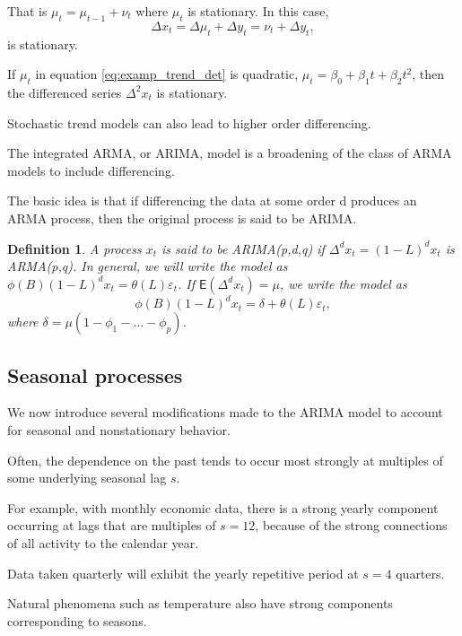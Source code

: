 \documentclass[
paper=128mm:96mm, %
fontsize=9.5pt, %
pagesize, %
parskip=half-, %
]{scrartcl} %
\theoremstyle{mythmstyle} %
\newtheorem{definition}[theorem]{Definition} %
\begin{document}
That is $\mu_t=\mu_{t-1}+\nu_t$ where $\mu_t$ is stationary. In this case,
%
\begin{equation}
\Delta x_t=\Delta \mu_t+\Delta y_t=\nu_t+\Delta y_t,
\end{equation}
%
is stationary. 

If $\mu_t$ in equation \eqref{eq:examp_trend_det} is quadratic, $\mu_t=\beta_0+\beta_1t+\beta_2t^2$, then the differenced series $\Delta^2x_t$  is stationary. 

Stochastic trend models can also lead to higher order differencing. 

The integrated ARMA, or ARIMA, model is a broadening of the class of ARMA models to include differencing. 

The basic idea is that if differencing the data at some order d produces an ARMA process, then the original process is said to be ARIMA.
\clearpage

\begin{definition}

A process $x_t$ is said to be ARIMA(p,d,q) if $\Delta^d x_t =(1-L)^dx_t$
is ARMA(p,q). In general, we will write the model as $\phi(B)(1-L)^dx_t=\theta(L)\varepsilon_t$.
If $\mathsf{E}(\Delta^dx_t)=\mu$, we write the model as
%
\begin{equation}
\phi(B)(1-L)^dx_t =\delta+\theta(L)\varepsilon_t,\nonumber
\end{equation}
where $\delta=\mu\left(1-\phi_1-\dots-\phi_p\right)$.
\end{definition}
\clearpage



\subsection{Seasonal processes}

We now introduce several modifications made to the ARIMA model to account for seasonal and nonstationary behavior. 

Often, the dependence on the past tends to occur most strongly at multiples of some underlying seasonal lag $s$. 

For example, with monthly economic data, there is a strong yearly component occurring at lags that are multiples of $s = 12$, because of the strong connections of all activity to the calendar year. 

Data taken quarterly will exhibit the yearly repetitive period at $s = 4$ quarters. 

Natural phenomena such as temperature also have strong components corresponding to seasons. 
\clearpage
\end{document}
